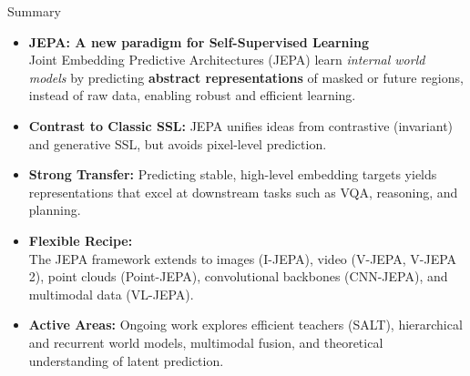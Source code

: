 \begin{frame}{Summary}
  \begin{itemize}\footnotesize
    \item \textbf{JEPA: A new paradigm for Self-Supervised Learning}\\
    Joint Embedding Predictive Architectures (JEPA) learn \emph{internal world models} by predicting \textbf{abstract representations} of masked or future regions, instead of raw data, enabling robust and efficient learning.
    \item \textbf{Contrast to Classic SSL:} JEPA unifies ideas from contrastive (invariant) and generative SSL, but avoids pixel-level prediction.
    \item \textbf{Strong Transfer:} Predicting stable, high-level embedding targets yields representations that excel at downstream tasks such as VQA, reasoning, and planning.
    \item \textbf{Flexible Recipe:}\\
    The JEPA framework extends to images (I-JEPA), video (V-JEPA, V-JEPA 2), point clouds (Point-JEPA), convolutional backbones (CNN-JEPA), and multimodal data (VL-JEPA).
    \item \textbf{Active Areas:} Ongoing work explores efficient teachers (SALT), hierarchical and recurrent world models, multimodal fusion, and theoretical understanding of latent prediction.
  \end{itemize}
\end{frame}
